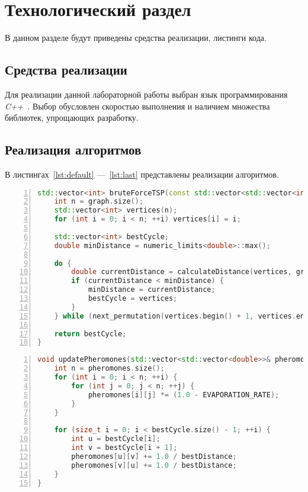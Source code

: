 \chapter{Технологический раздел}

В данном разделе будут приведены средства реализации, листинги кода.

\section{Средства реализации}
Для реализации данной лабораторной работы выбран язык программирования \textit{C++}~\cite{C++}. Выбор обусловлен скоростью выполнения и наличием множества библиотек, упрощающих разработку.

\section{Реализация алгоритмов}
В листингах~\ref{lst:default} ---~\ref{lst:last} представлены реализации алгоритмов.

\begin{center}
\captionsetup{justification=raggedright,singlelinecheck=off}
\begin{lstlisting}[language=C++, frame=single, numbers=left, label=lst:default, caption=Реализация алгоритма полного перебора]
std::vector<int> bruteForceTSP(const std::vector<std::vector<int>>& graph) {
    int n = graph.size();
    std::vector<int> vertices(n);
    for (int i = 0; i < n; ++i) vertices[i] = i;

    std::vector<int> bestCycle;
    double minDistance = numeric_limits<double>::max();

    do {
        double currentDistance = calculateDistance(vertices, graph);
        if (currentDistance < minDistance) {
            minDistance = currentDistance;
            bestCycle = vertices;
        }
    } while (next_permutation(vertices.begin() + 1, vertices.end()));

    return bestCycle;
}
\end{lstlisting}
\end{center}


\begin{center}
\captionsetup{justification=raggedright,singlelinecheck=off}
\begin{lstlisting}[language=C++, frame=single, numbers=left, label=lst:vinograd,caption=Реализация функции обновления ферамонов]
void updatePheromones(std::vector<std::vector<double>>& pheromones, const std::vector<int>& bestCycle, double bestDistance) {
    int n = pheromones.size();
    for (int i = 0; i < n; ++i) {
        for (int j = 0; j < n; ++j) {
            pheromones[i][j] *= (1.0 - EVAPORATION_RATE);
        }
    }

    for (size_t i = 0; i < bestCycle.size() - 1; ++i) {
        int u = bestCycle[i];
        int v = bestCycle[i + 1];
        pheromones[u][v] += 1.0 / bestDistance;
        pheromones[v][u] += 1.0 / bestDistance;
    }
}
\end{lstlisting}
\end{center}

